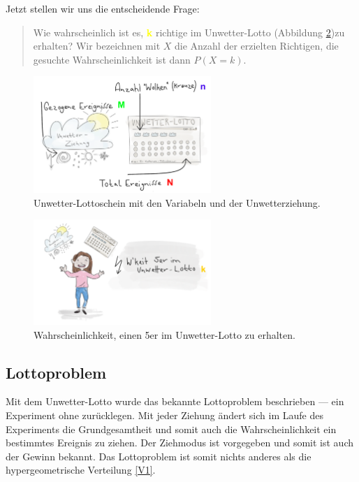 \begin{refsection}
Jetzt stellen wir uns die entscheidende Frage: 
\begin{quote}
Wie wahrscheinlich ist es, \textcolor{yellow}{\textbf{k}} richtige im Unwetter-Lotto (Abbildung \ref{WahrscheinlichkeitUnwetter-Lotto})zu erhalten? Wir bezeichnen mit $X$ die Anzahl der erzielten Richtigen, die gesuchte Wahrscheinlichkeit ist dann $P(X=k)$.
\end{quote}

\begin{figure}
\centering
\includegraphics[width=0.6\textwidth]{extrem/Lottoscheinausgefuellt.pdf}
\caption{Unwetter-Lottoschein mit den Variabeln und der Unwetterziehung.}
\label{ErklaerungLotto}
\end{figure}

\begin{figure}
\centering
\includegraphics[width=0.6\textwidth]{extrem/wkeitlotto.pdf}
\caption{Wahrscheinlichkeit, einen 5er im Unwetter-Lotto zu erhalten.}
\label{WahrscheinlichkeitUnwetter-Lotto}
\end{figure}


\subsection{Lottoproblem} \label{Lottoproblem}
Mit dem Unwetter-Lotto wurde das bekannte Lottoproblem beschrieben --- ein Experiment ohne zurücklegen. Mit jeder Ziehung ändert sich im Laufe des Experiments die Grundgesamtheit und somit auch die Wahrscheinlichkeit ein bestimmtes Ereignis zu ziehen. Der Ziehmodus ist vorgegeben und somit ist auch der Gewinn bekannt. Das Lottoproblem ist somit nichts anderes als die hypergeometrische Verteilung \eqref{V1}.


\end{refsection}
